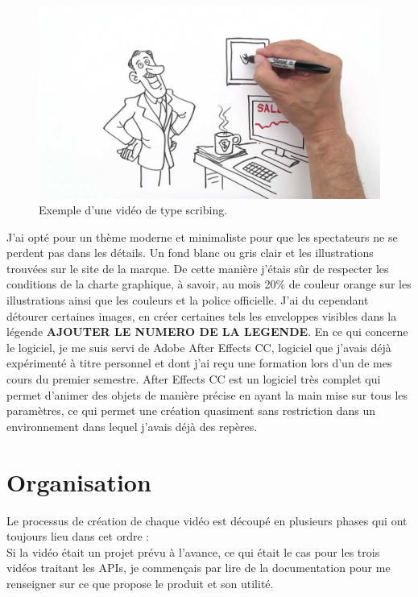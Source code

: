 \begin{figure}[htp]
  \centering
  \includegraphics[width=15cm]{images/scribe}
  \caption{Exemple d'une vidéo de type scribing.}
  \label{scribe}
\end{figure}

J'ai opté pour un thème moderne et minimaliste pour que les spectateurs ne se perdent pas dans les détails. Un fond blanc ou gris clair et les illustrations trouvées sur le site de la marque. De cette manière j'étais sûr de respecter les conditions de la charte graphique, à savoir, au mois 20\% de couleur orange sur les illustrations ainsi que les couleurs et la police officielle. J'ai du cependant détourer certaines images, en créer certaines tels les enveloppes visibles dans la légende \textbf{AJOUTER LE NUMERO DE LA LEGENDE}. En ce qui concerne le logiciel, je me suis servi de Adobe After Effects CC, logiciel que j'avais déjà expérimenté à titre personnel et dont j'ai reçu une formation lors d'un de mes cours du premier semestre. After Effects CC est un logiciel très complet qui permet d'animer des objets de manière précise en ayant la main mise sur tous les paramètres, ce qui permet une création quasiment sans restriction dans un environnement dans lequel j'avais déjà des repères.

\section{Organisation}
Le processus de création de chaque vidéo est découpé en plusieurs phases qui ont toujours lieu dans cet ordre :\\

Si la vidéo était un projet prévu à l'avance, ce qui était le cas pour les trois vidéos traitant les APIs, je commençais par lire de la documentation pour me renseigner sur ce que propose le produit et son utilité.\\

